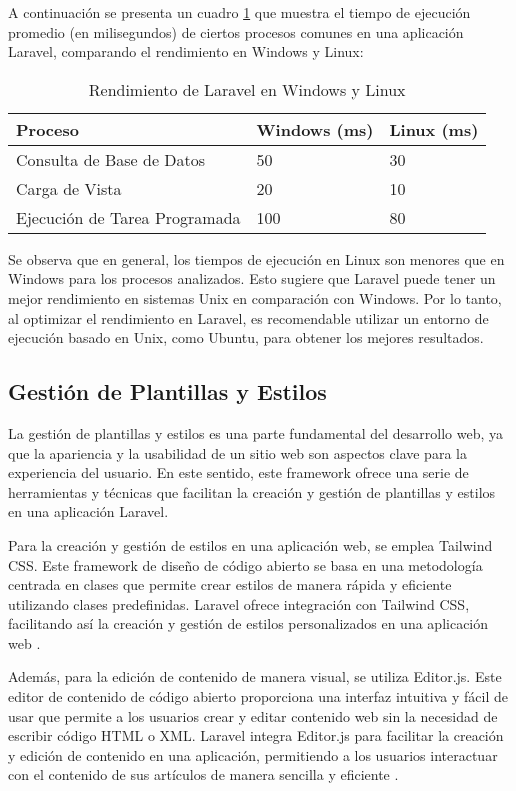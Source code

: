 A continuación se presenta un cuadro \ref{table:laravel_performance} que muestra el tiempo de ejecución promedio (en milisegundos) de ciertos procesos comunes en una aplicación Laravel, comparando el rendimiento en Windows y Linux:

\begin{table}[H]
\centering
\begin{tabular}{|l|l|l|}
\hline
\textbf{Proceso} & \textbf{Windows (ms)} & \textbf{Linux (ms)} \\ \hline
Consulta de Base de Datos & 50 & 30 \\ \hline
Carga de Vista & 20 & 10 \\ \hline
Ejecución de Tarea Programada & 100 & 80 \\ \hline
\end{tabular}
\caption{Rendimiento de Laravel en Windows y Linux}
\label{table:laravel_performance}
\end{table}

Se observa que en general, los tiempos de ejecución en Linux son menores que en Windows para los procesos analizados. Esto sugiere que Laravel puede tener un mejor rendimiento en sistemas Unix en comparación con Windows. Por lo tanto, al optimizar el rendimiento en Laravel, es recomendable utilizar un entorno de ejecución basado en Unix, como Ubuntu, para obtener los mejores resultados.

\subsection{Gestión de Plantillas y Estilos}
La gestión de plantillas y estilos es una parte fundamental del desarrollo web, ya que la apariencia y la usabilidad de un sitio web son aspectos clave para la experiencia del usuario. En este sentido, este framework ofrece una serie de herramientas y técnicas que facilitan la creación y gestión de plantillas y estilos en una aplicación Laravel.

Para la creación y gestión de estilos en una aplicación web, se emplea Tailwind CSS. Este framework de diseño de código abierto se basa en una metodología centrada en clases que permite crear estilos de manera rápida y eficiente utilizando clases predefinidas. Laravel ofrece integración con Tailwind CSS, facilitando así la creación y gestión de estilos personalizados en una aplicación web \cite{tailwind}.

Además, para la edición de contenido de manera visual, se utiliza Editor.js. Este editor de contenido de código abierto proporciona una interfaz intuitiva y fácil de usar que permite a los usuarios crear y editar contenido web sin la necesidad de escribir código HTML o XML. Laravel integra Editor.js para facilitar la creación y edición de contenido en una aplicación, permitiendo a los usuarios interactuar con el contenido de sus artículos de manera sencilla y eficiente \cite{editorjs}.


